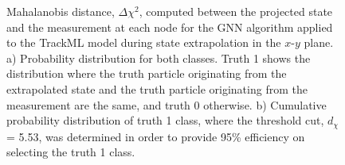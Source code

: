 \begin{figure}[htbp!] 
    \centering
    \hfill%
    \caption{Mahalanobis distance, $\Delta \chi^{2}$, computed between the projected state and the measurement at each node for the GNN algorithm applied to the TrackML model during state extrapolation in the $x$-$y$ plane. a) Probability distribution for both classes. Truth 1 shows the distribution where the truth particle originating from the extrapolated state and the truth particle originating from the measurement are the same, and truth 0 otherwise. b) Cumulative probability distribution of truth 1 class, where the threshold cut, $d_{\chi}$ = 5.53, was determined in order to provide 95\% efficiency on selecting the truth 1 class.}
    \label{fig:mahalanobis-threshold-trackml-xy}
\end{figure}



